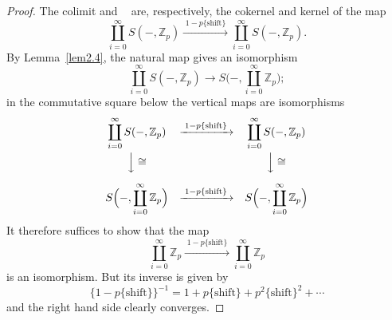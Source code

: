 \documentclass[11pt,a4paper]{article}
\theoremstyle{plain}
\theoremstyle{definition}
\DeclareMathOperator{\colim}{colim}
\DeclareMathOperator{\colimone}{\colim\nolimits^{1}}
\numberwithin{equation}{section}
\begin{document}
\begin{proof}
The colimit and $\colimone$ are, respectively, the cokernel and kernel of the map
\begin{equation*}
\coprod_{i=0}^{\infty} S(-,\mathbb{Z}_{p}) \xrightarrow{\;1-p\{\text{shift}\}\;} \coprod_{i=0}^{\infty} S(-,\mathbb{Z}_{p}).
\end{equation*}
By Lemma~\ref{lem2.4}, the natural map gives an isomorphism
\begin{equation*}
\coprod_{i=0}^{\infty} S(-,\mathbb{Z}_{p}) \longrightarrow S\Big(-,\coprod_{i=0}^{\infty} \mathbb{Z}_{p}\Big);
\end{equation*}
in the commutative square below the vertical maps are isomorphisms
\begin{equation*}
\begin{array}{ccc}
\displaystyle \coprod_{i=0}^{\infty} S(-,\mathbb{Z}_{p}) & \xrightarrow{\;1-p\{\text{shift}\}\;} & \displaystyle \coprod_{i=0}^{\infty} S(-,\mathbb{Z}_{p}) \\[12pt]
\Big\downarrow\cong & & \Big\downarrow\cong \\[12pt]
\displaystyle S\Big(-,\coprod_{i=0}^{\infty} \mathbb{Z}_{p}\Big) & \xrightarrow{\;1-p\{\text{shift}\}\;} & \displaystyle S\Big(-,\coprod_{i=0}^{\infty} \mathbb{Z}_{p}\Big)
\end{array}
\end{equation*}
It therefore suffices to show that the map
\begin{equation*}
\coprod_{i=0}^{\infty} \mathbb{Z}_{p} \xrightarrow{\;1-p\{\text{shift}\}\;} \coprod_{i=0}^{\infty} \mathbb{Z}_{p}
\end{equation*}
is an isomorphism. But its inverse is given by
\begin{equation*}
\{1-p\{\text{shift}\}\}^{-1} = 1 + p\{\text{shift}\} + p^{2}\{\text{shift}\}^{2} + \cdots
\end{equation*}
and the right hand side clearly converges. \qedhere
\end{proof}
\end{document}
